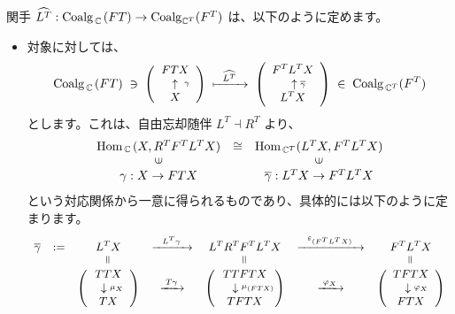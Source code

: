 \documentclass[
		head_space=20mm,
		foot_space=20mm,
		gutter=10mm,
		line_length=190mm
]{jlreq}
\begin{document}
	\noindent 
	関手 $\widehat{L^T}:\mathrm{Coalg}_{\,\mathbb{C}\,}(FT)\to\mathrm{Coalg}_{\mathbb{C}^T}(F^T)$ は、以下のように定めます。
	\begin{itemize}
		\item 対象に対しては、
		\[\small \mathrm{Coalg}_{\,\mathbb{C}\,}(FT)\;\ni\;\left(\begin{array}{c}FTX\\~~~\uparrow\;\substack{\gamma}\\X\end{array}\right)\;\xmapsto{~~\widehat{L^T}~~}\;\left(\begin{array}{c}F^TL^TX\\~~~\uparrow \substack{\overline\gamma}\\ L^TX\end{array}\right)\;\in\;\mathrm{Coalg}_{\,\mathbb{C}^T}(F^T)\]
		とします。これは、自由忘却随伴 $L^T\dashv R^T$ より、
		\[\begin{array}{ccc}\Hom_{\,\C\,}(X,R^TF^TL^TX)&\cong&\Hom_{\,\C^T}(L^TX,F^TL^TX)\\\rotatebox{90}{$\in$}&&\rotatebox{90}{$\in$}\\\gamma:X\to FTX&&\overline\gamma:L^TX\to F^TL^TX\end{array}\]
		という対応関係から一意に得られるものであり、具体的には以下のように定まります。
		\[\small \begin{array}{ccccccc}\overline\gamma&:=&L^TX & \xrightarrow{~~L^T\gamma~~}&L^TR^TF^TL^TX&\xrightarrow{~~\varepsilon_{(F^TL^TX)}~~}& F^TL^TX\\ && \rotatebox{90}{$=$} && \rotatebox{90}{$=$} && \rotatebox{90}{$=$} \\ && \left(\begin{array}{c}TTX\\~~\downarrow\substack{\mu_X}\\TX\end{array}\right) & \xrightarrow{\;T\gamma\;} & \left(\begin{array}{c}TTFTX\\~~~\downarrow\substack{\mu_{(FTX)}}\!\!\! \\TFTX\end{array}\right) & \xrightarrow{\;\varphi_X\;} & \left(\begin{array}{c}TFTX\\~~\downarrow\substack{\varphi_X}\!\!\\FTX\end{array}\right) \end{array}\]

\end{itemize}
\end{document}

